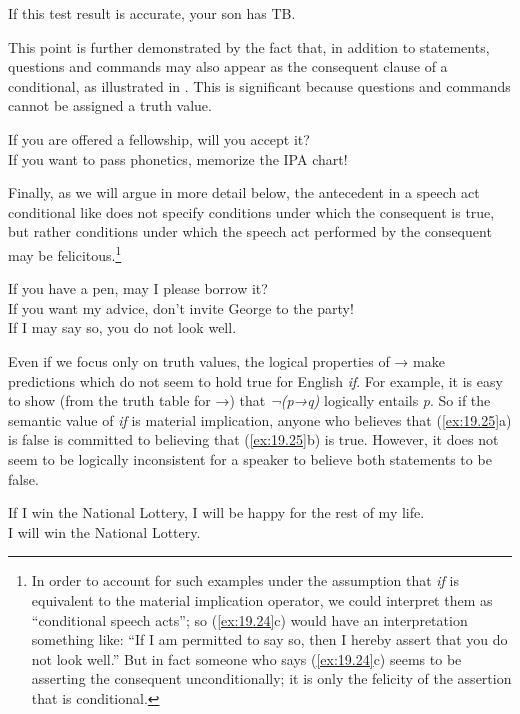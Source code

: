 \ea \label{ex:19.22}
If this test result is accurate, your son has TB.
\z


This point is further demonstrated by the fact that, in addition to statements, questions and commands may also appear as the consequent clause of a conditional, as illustrated in . This is significant because questions and commands cannot be assigned a truth value.


\ea \label{ex:19.23}
\ea  If you are offered a fellowship, will you accept it?\\
\ex If you want to pass phonetics, memorize the IPA chart!
                       \z
\z


Finally, as we will argue in more detail below, the antecedent in a speech act conditional like  does not specify conditions under which the consequent is true, but rather conditions under which the speech act performed by the consequent may be felicitous.\footnote{In order to account for such examples under the assumption that \textit{if} is equivalent to the material implication operator, we could interpret them as “conditional speech acts”; so (\ref{ex:19.24}c) would have an interpretation something like: “If I am permitted to say so, then I hereby assert that you do not look well.” But in fact someone who says (\ref{ex:19.24}c) seems to be asserting the consequent unconditionally; it is only the felicity of the assertion that is conditional.}


\ea \label{ex:19.24}
\ea  If you have a pen, may I please borrow it?\\
\ex If you want my advice, don’t invite George to the party!\\
\ex If I may say so, you do not look well.
                       \z
\z


Even if we focus only on truth values, the logical properties of → make predictions which do not seem to hold true for English \textit{if}. For example, it is easy to show (from the truth table for →) that \textit{¬(p→q)} logically entails \textit{p}. So if the semantic value of \textit{if} is material implication, anyone who believes that (\ref{ex:19.25}a) is false is committed to believing that (\ref{ex:19.25}b) is true. However, it does not seem to be logically inconsistent for a speaker to believe both statements to be false.


\ea \label{ex:19.25}
\ea  If I win the National Lottery, I will be happy for the rest of my life.\\
\ex I will win the National Lottery.
                       \z
\z


